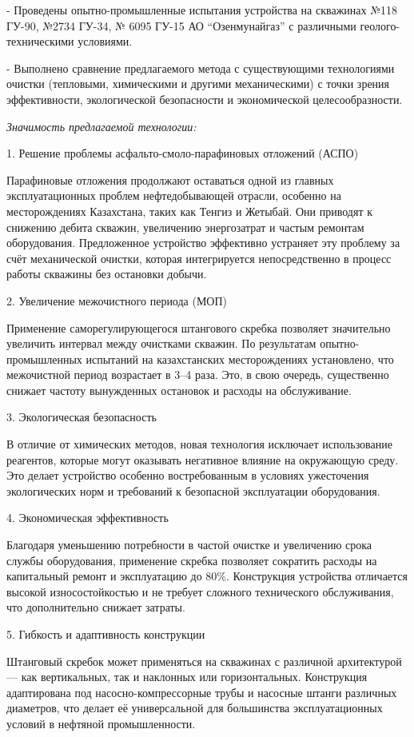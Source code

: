 \begin{multicols}{2}
- Проведены опытно-промышленные испытания устройства на скважинах №118
ГУ-90, №2734 ГУ-34, № 6095 ГУ-15 АО ``Озенмунайгаз'' с различными
геолого-техническими условиями.

- Выполнено сравнение предлагаемого метода с существующими технологиями
очистки (тепловыми, химическими и другими механическими) с точки
зрения эффективности, экологической безопасности и экономической
целесообразности.

\emph{Значимость предлагаемой технологии:}

1. Решение проблемы асфальто-смоло-парафиновых отложений (АСПО)

Парафиновые отложения продолжают оставаться одной из главных
эксплуатационных проблем нефтедобывающей отрасли, особенно на
месторождениях Казахстана, таких как Тенгиз и Жетыбай. Они приводят к
снижению дебита скважин, увеличению энергозатрат и частым ремонтам
оборудования. Предложенное устройство эффективно устраняет эту проблему
за счёт механической очистки, которая интегрируется непосредственно в
процесс работы скважины без остановки добычи.

2. Увеличение межочистного периода (МОП)

Применение саморегулирующегося штангового скребка позволяет значительно
увеличить интервал между очистками скважин. По результатам
опытно-промышленных испытаний на казахстанских месторождениях
установлено, что межочистной период возрастает в 3--4 раза. Это, в свою
очередь, существенно снижает частоту вынужденных остановок и расходы на
обслуживание.

3. Экологическая безопасность

В отличие от химических методов, новая технология исключает
использование реагентов, которые могут оказывать негативное влияние на
окружающую среду. Это делает устройство особенно востребованным в
условиях ужесточения экологических норм и требований к безопасной
эксплуатации оборудования.

4. Экономическая эффективность

Благодаря уменьшению потребности в частой очистке и увеличению срока
службы оборудования, применение скребка позволяет сократить расходы на
капитальный ремонт и эксплуатацию до 80\%. Конструкция устройства
отличается высокой износостойкостью и не требует сложного технического
обслуживания, что дополнительно снижает затраты.

5. Гибкость и адаптивность конструкции

Штанговый скребок может применяться на скважинах с различной
архитектурой --- как вертикальных, так и наклонных или горизонтальных.
Конструкция адаптирована под насосно-компрессорные трубы и насосные
штанги различных диаметров, что делает её универсальной для большинства
эксплуатационных условий в нефтяной промышленности.


\end{multicols}
